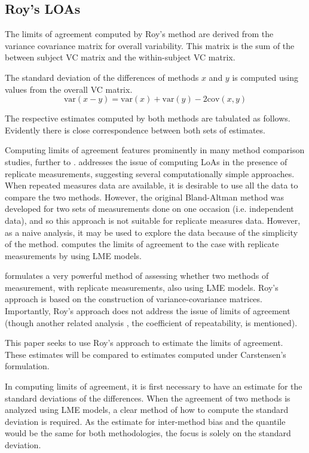 \documentclass[12pt, a4paper]{report}
\theoremstyle{plain}
\theoremstyle{definition}
\theoremstyle{remark}
\begin{document}
\subsection{Roy's LOAs}

The limits of agreement computed by Roy's method are derived from the variance covariance matrix for overall variability.
This matrix is the sum of the between subject VC matrix and the within-subject VC matrix.

The standard deviation of the differences of methods $x$ and $y$ is computed using values from the overall VC matrix.
\[
\mbox{var}(x - y ) = \mbox{var} ( x )  + \mbox{var} ( y ) - 2\mbox{cov} ( x ,y )
\]


The respective estimates computed by both methods are tabulated as follows. Evidently there is close correspondence between both sets of estimates.


\newpage

Computing limits of agreement features prominently in many method comparison studies, further to \citet{BA86,BA99}.
\citet{BA99} addresses the issue of computing LoAs in the presence of replicate measurements, suggesting several computationally simple approaches. When repeated measures data are available, it is desirable to use
all the data to compare the two methods. However, the original Bland-Altman method was developed for two sets of measurements done on one occasion (i.e. independent data), and so this approach is not suitable for replicate measures data. However, as a naive analysis, it may be used to explore the data because of the simplicity of the method.
\citet{bxc2008}  computes the limits of agreement to the case with replicate measurements by using LME models.

\citet{Roy} formulates a very powerful method of assessing whether two methods of measurement, with replicate measurements, also using LME models. Roy's approach is based on the construction of variance-covariance matrices.
Importantly, Roy's approach does not address the issue of limits of agreement (though another related analysis , the coefficient of repeatability, is mentioned).

This paper seeks to use Roy's approach to estimate the limits of agreement. These estimates will be compared to estimates computed under Carstensen's formulation.

In computing limits of agreement, it is first necessary to have an estimate for the standard deviations of the differences. When the agreement of two methods is analyzed using LME models, a clear method of how to compute the standard deviation is required. As the estimate for inter-method bias and the quantile would be the same for both methodologies, the focus is solely on the standard deviation.
\end{document}
